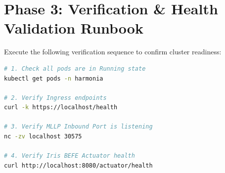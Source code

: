 \section{Phase 3: Verification \& Health Validation Runbook}

Execute the following verification sequence to confirm cluster readiness:
\begin{lstlisting}[language=bash, caption={Cluster Readiness and Health Probe Verification}]
# 1. Check all pods are in Running state
kubectl get pods -n harmonia

# 2. Verify Ingress endpoints
curl -k https://localhost/health

# 3. Verify MLLP Inbound Port is listening
nc -zv localhost 30575

# 4. Verify Iris BEFE Actuator health
curl http://localhost:8080/actuator/health
\end{lstlisting}

\newpage
